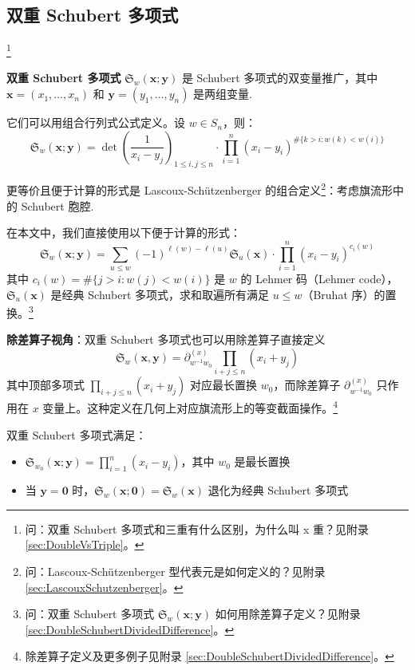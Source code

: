 \subsection{双重 Schubert 多项式}\footnote{问：双重 Schubert 多项式和三重有什么区别，为什么叫 x 重？见附录 \cref{sec:DoubleVsTriple}。}

\begin{Definition}
\label{def:DoubleSchubertPolynomial}
\textbf{双重 Schubert 多项式} $\mathfrak{S}_w(\mathbf{x}; \mathbf{y})$ 是 Schubert 多项式的双变量推广，其中 $\mathbf{x} = (x_1, \ldots, x_n)$ 和 $\mathbf{y} = (y_1, \ldots, y_n)$ 是两组变量.

它们可以用组合行列式公式定义。设 $w \in S_n$，则：
\begin{equation}
\mathfrak{S}_w(\mathbf{x}; \mathbf{y}) = \det\!\left( \frac{1}{x_i - y_j} \right)_{1 \leq i, j \leq n} \cdot \prod_{i=1}^n (x_i - y_i)^{\#\{k > i : w(k) < w(i)\}}
\end{equation}

更等价且便于计算的形式是 Lascoux-Schützenberger 的组合定义{}\footnote{问：Lascoux-Schützenberger 型代表元是如何定义的？见附录 \cref{sec:LascouxSchutzenberger}。}：考虑旗流形中的 Schubert 胞腔.

在本文中，我们直接使用以下便于计算的形式：
\begin{equation}
\mathfrak{S}_w(\mathbf{x}; \mathbf{y}) = \sum_{u \leq w} (-1)^{\ell(w)-\ell(u)} \mathfrak{S}_u(\mathbf{x}) \cdot \prod_{i=1}^n (x_i - y_i)^{c_i(w)}
\end{equation}
其中 $c_i(w) = \#\{j > i : w(j) < w(i)\}$ 是 $w$ 的 Lehmer 码（Lehmer code），$\mathfrak{S}_u(\mathbf{x})$ 是经典 Schubert 多项式，求和取遍所有满足 $u \leq w$（Bruhat 序）的置换。\footnote{问：双重 Schubert 多项式 $\mathfrak{S}_w(\mathbf{x};\mathbf{y})$ 如何用除差算子定义？见附录 \cref{sec:DoubleSchubertDividedDifference}。}

\textbf{除差算子视角}：双重 Schubert 多项式也可以用除差算子直接定义
$$\mathfrak{S}_w(\mathbf{x}, \mathbf{y}) = \partial_{w^{-1}w_0}^{(x)} \prod_{i+j\leq n}(x_i+y_j)$$
其中顶部多项式 $\prod_{i+j\leq n}(x_i+y_j)$ 对应最长置换 $w_0$，而除差算子 $\partial_{w^{-1}w_0}^{(x)}$ 只作用在 $x$ 变量上。这种定义在几何上对应旗流形上的等变截面操作。\footnote{除差算子定义及更多例子见附录 \cref{sec:DoubleSchubertDividedDifference}。}

双重 Schubert 多项式满足：
\begin{itemize}
\item $\mathfrak{S}_{w_0}(\mathbf{x}; \mathbf{y}) = \prod_{i=1}^n (x_i - y_i)$，其中 $w_0$ 是最长置换
\item 当 $\mathbf{y} = \mathbf{0}$ 时，$\mathfrak{S}_w(\mathbf{x}; \mathbf{0}) = \mathfrak{S}_w(\mathbf{x})$ 退化为经典 Schubert 多项式
\end{itemize}
\end{Definition}

